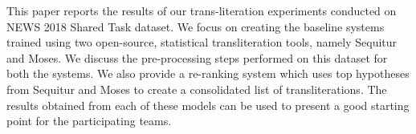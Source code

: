 This paper reports the results of our trans-literation experiments conducted on NEWS 2018 Shared Task dataset. We focus on creating the baseline systems trained using two open-source, statistical transliteration tools, namely Sequitur and Moses. We discuss the pre-processing steps performed on this dataset for both the systems. We also provide a re-ranking system which uses top hypotheses from Sequitur and Moses to create a consolidated list of transliterations. The results obtained from each of these models can be used to present a good starting point for the participating teams.
